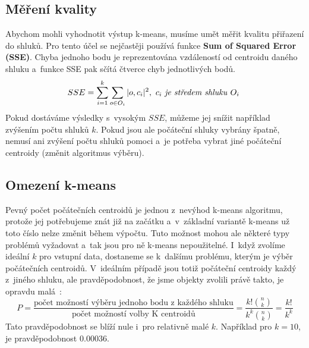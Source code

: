 \subsection{Měření kvality}
Abychom mohli vyhodnotit výstup k-means, musíme umět měřit kvalitu přiřazení do shluků. Pro tento účel se nejčastěji používá funkce \textbf{Sum of Squared Error (SSE)}. Chyba jednoho bodu je reprezentována vzdáleností od centroidu daného shluku a~funkce SSE pak sčítá čtverce chyb jednotlivých bodů.
\begin{equation}\label{eq:SSE}
SSE = \sum^k_{i=1}\sum_{o \in O_i}|o,c_i|^2, \textrm{ $c_i$ \textit{je středem shluku} $O_i$ }
\end{equation}
Pokud dostáváme výsledky s~vysokým $SSE$, můžeme jej snížit například zvýšením počtu shluků $k$. Pokud jsou ale počáteční shluky vybrány špatně, nemusí ani zvýšení počtu shluků pomoci a~je potřeba vybrat jiné počáteční centroidy (změnit algoritmus výběru).\\

\subsection{Omezení k-means} \label{ssec:kmeansrestrictions}
Pevný počet počátečních centroidů je jednou z~nevýhod k-means algoritmu, protože jej potřebujeme znát již na začátku a~v~základní variantě k-means už toto číslo nelze změnit během výpočtu. Tuto možnost mohou ale některé typy problémů vyžadovat a~tak jsou pro ně k-means nepoužitelné.  I~když zvolíme ideální $k$ pro vstupní data, dostaneme se k~dalšímu problému, kterým je výběr počátečních centroidů. V~ideálním případě jsou totiž počáteční centroidy každý z~jiného shluku, ale pravděpodobnost, že jsme objekty zvolili právě takto, je opravdu malá~\cite{Tan05}:
\begin{equation}\label{eq:centroidChooseProbability}
P = \frac{\mbox{počet možností výběru jednoho bodu z~každého shluku}}{\mbox{počet možností volby K~centroidů}}=\frac{k!{n \choose k}}{k^k {n \choose k} }=\frac{k!}{k^k}
\end{equation}
Tato pravděpodobnost se blíží nule i~pro relativně malé $k$. Například pro $k=10$, je pravděpodobnost $0.00036$. \\

